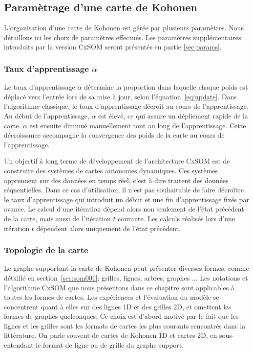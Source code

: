 \documentclass[../main]{subfiles}
\begin{document}
\subsection{Paramètrage d'une carte de Kohonen}
L'organisation d'une carte de Kohonen est gérée par plusieurs paramètres. 
Nous détaillons ici les choix de paramètres effectués. Les paramètres supplémentaires introduits par la version CxSOM seront présentés en partie \ref{sec:params}.

\subsubsection{Taux d'apprentissage $\alpha$}
Le taux d'apprentissage $\alpha$ détermine la proportion dans laquelle chaque poids est déplacé vers l'entrée lors de sa mise à jour, selon l'équation~\ref{eq:update}. Dans l'algorithme classique, le taux d'apprentissage décroît au cours de l'apprentissage. Au début de l'apprentissage, $\alpha$ est élevé, ce qui assure un dépliement rapide de la carte. $\alpha$ est ensuite diminué manuellement tout au long de l'apprentissage. Cette décroissance accompagne la convergence des poids de la carte au cours de l'apprentissage.

Un objectif à long terme de développement de l'architecture CxSOM est de construire des systèmes de cartes autonomes dynamiques. Ces systèmes apprennent sur des données en temps réel, c'est à dire traitent des données séquentielles. Dans ce cas d'utilisation, il n'est pas souhaitable de faire décroître le taux d'apprentissage qui introduit un début et une fin d'apprentissage fixés par avance. Le calcul d'une itération dépend alors non seulement de l'état précédent de la carte, mais aussi de l'itération $t$ courante. Les calculs réalisés lors d'une itération $t$ dépendent alors uniquement de l'état précédent.


\subsubsection{Topologie de la carte}

Le graphe supportant la carte de Kohonen peut présenter diverses formes, comme détaillé en section~\ref{sec:som001}: grilles, lignes, arbres, graphes ... Les notations et l'algorithme CxSOM que nous présentons dans ce chapitre sont applicables à toutes les formes de cartes. Les expériences et l'évaluation du modèle se concentrent quant à elles sur des lignes 1D et des grilles 2D, et omettent les formes de graphes quelconques. Ce choix est d'abord motivé par le fait que les lignes et les grilles sont les formats de cartes les plus courants rencontrés dans la littérature. On parle souvent de cartes de Kohonen 1D et cartes 2D, en sous-entendant le format de ligne ou de grille du graphe support. 
\end{document}
